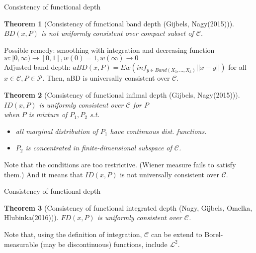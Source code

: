 \documentclass[aspectratio=169,ignorenonframetext,9pt]{beamer}
\theoremstyle{plain}
\newtheorem{thm}{Theorem}[section]
\theoremstyle{definition}
\begin{document}
\begin{frame}{Consistency of functional depth}
    \begin{thm}[Consistency of functional band depth (Gijbels, Nagy(2015))]
        $BD(x,P)$ is not uniformly consistent over compact subset of $\mathcal{C}$.
    \end{thm}
    Possible remedy: smoothing with integration and decreasing function $w:[0,\infty)\rightarrow[0,1],w(0)=1,w(\infty)\rightarrow 0$ \\
    Adjusted band depth: \(aBD(x,P)=Ew(inf_{y\in Band(X_1,...,X_k)} ||x-y||)\) for all $x\in\mathcal{C},P\in\mathcal{P}$.
    Then, aBD is universally consistent over $\mathcal{C}$.
    \begin{thm}[Consistency of functional infimal depth (Gijbels, Nagy(2015))]
        $ID(x,P)$ is uniformly consistent over $\mathcal{C}$ for $P$ \\ 
        when $P$ is mixture of $P_1,P_2$ s.t.
        \begin{itemize}
            \item all marginal distribution of $P_1$ have continuous dist. functions.
            \item $P_2$ is concentrated in finite-dimensional subspace of $\mathcal{C}$.
        \end{itemize}
    \end{thm}
    Note that the conditions are too restrictive. (Wiener measure fails to satisfy them.)
    And it means that $ID(x,P)$ is not universally consistent over $\mathcal{C}$.
\end{frame}

\begin{frame}{Consistency of functional depth}
    \begin{thm}[Consistency of functional integrated depth (Nagy, Gijbels, Omelka, Hlubinka(2016))]
        $FD(x,P)$ is uniformly consistent over $\mathcal{C}$.
    \end{thm}
    Note that, using the definition of integration, $\mathcal{C}$ can be extend to
    Borel-measurable (may be discontinuous) functions, include $\mathcal{L}^2$.
\end{frame}
\end{document}
